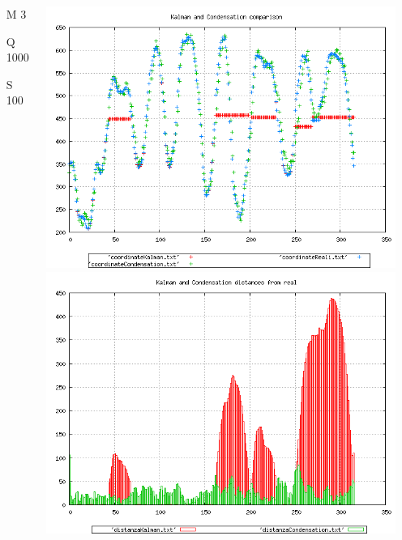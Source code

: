 \documentclass{beamer}
\begin{document}
{\begin{columns}
\begin{scriptsize}
\begin{itemize}
\item [M]3
\item [Q]1000
\item [S]100
\end{itemize}
\end{scriptsize}
\includegraphics[scale=0.1]{../esperimenti/movie12/mod_3-Q_1000-S_100/plot.png}\\
\includegraphics[scale=0.1]{../esperimenti/movie12/mod_3-Q_1000-S_100/plot-distances.png}
\end{columns}

}
\end{document}

